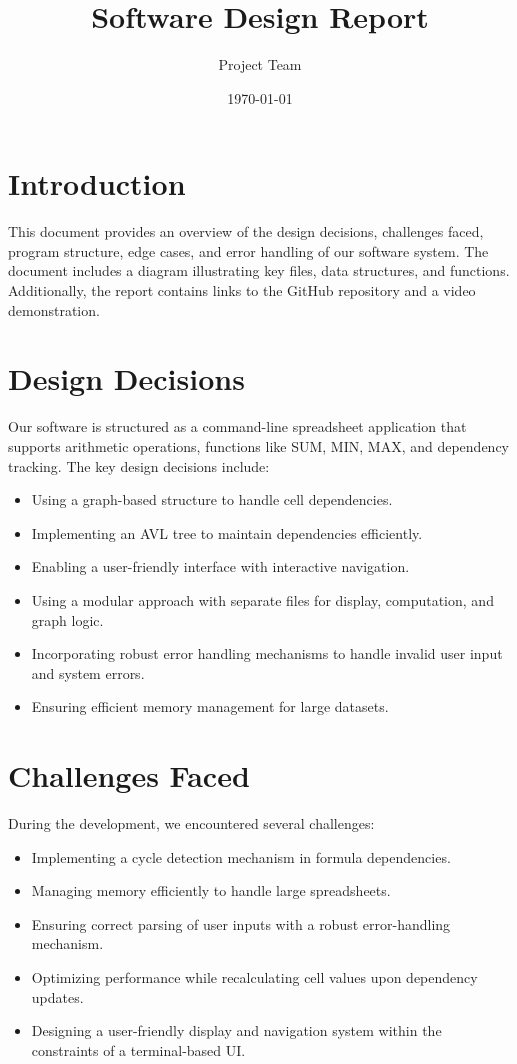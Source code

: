 \documentclass{article}
\title{Software Design Report}
\author{Project Team}
\date{\today}
\begin{document}
\maketitle

\section{Introduction}
This document provides an overview of the design decisions, challenges faced, program structure, edge cases, and error handling of our software system. The document includes a diagram illustrating key files, data structures, and functions. Additionally, the report contains links to the GitHub repository and a video demonstration.

\section{Design Decisions}
Our software is structured as a command-line spreadsheet application that supports arithmetic operations, functions like SUM, MIN, MAX, and dependency tracking. The key design decisions include:
\begin{itemize}
    \item Using a graph-based structure to handle cell dependencies.
    \item Implementing an AVL tree to maintain dependencies efficiently.
    \item Enabling a user-friendly interface with interactive navigation.
    \item Using a modular approach with separate files for display, computation, and graph logic.
    \item Incorporating robust error handling mechanisms to handle invalid user input and system errors.
    \item Ensuring efficient memory management for large datasets.
\end{itemize}

\section{Challenges Faced}
During the development, we encountered several challenges:
\begin{itemize}
    \item Implementing a cycle detection mechanism in formula dependencies.
    \item Managing memory efficiently to handle large spreadsheets.
    \item Ensuring correct parsing of user inputs with a robust error-handling mechanism.
    \item Optimizing performance while recalculating cell values upon dependency updates.
    \item Designing a user-friendly display and navigation system within the constraints of a terminal-based UI.
\end{itemize}
\end{document}
